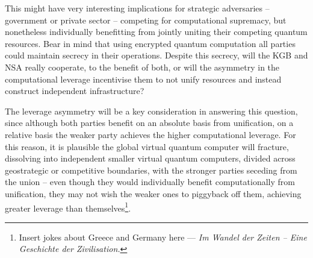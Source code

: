 This might have very interesting implications for strategic adversaries -- government or private sector -- competing for computational supremacy, but nonetheless individually benefitting from jointly uniting their competing quantum resources. Bear in mind that using encrypted quantum computation all parties could maintain secrecy in their operations. Despite this secrecy, will the KGB and NSA really cooperate, to the benefit of both, or will the asymmetry in the computational leverage incentivise them to not unify resources and instead construct independent infrastructure?

The leverage asymmetry will be a key consideration in answering this question, since although both parties benefit on an absolute basis from unification, on a relative basis the weaker party achieves the higher computational leverage. For this reason, it is plausible the global virtual quantum computer will fracture, dissolving into independent smaller virtual quantum computers, divided across geostrategic or competitive boundaries, with the stronger parties seceding from the union -- even though they would individually benefit computationally from unification, they may not wish the weaker ones to piggyback off them, achieving greater leverage than themselves\footnote{Insert jokes about Greece and Germany here --- \textit{Im Wandel der Zeiten -- Eine Geschichte der Zivilisation.}}.
